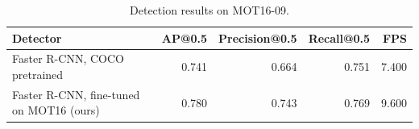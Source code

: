 \begin{table}[h]
\caption{Detection results on MOT16-09.}
\label{tab:detector}
\begin{tabular}{lrrrr}
\toprule
Detector & AP@0.5 & Precision@0.5 & Recall@0.5 & FPS \\
\midrule
Faster R-CNN, COCO pretrained & 0.741 & 0.664 & 0.751 & 7.400 \\
Faster R-CNN, fine-tuned on MOT16 (ours) & 0.780 & 0.743 & 0.769 & 9.600 \\
\bottomrule
\end{tabular}
\end{table}
